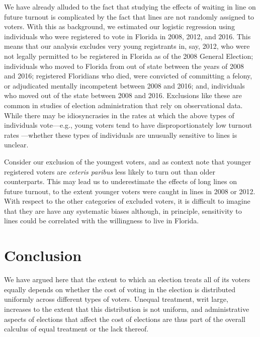 \documentclass[12pt,titlepage]{article}
\begin{document}
We have already alluded to the fact that studying the effects of
waiting in line on future turnout is complicated by the fact that
lines are not randomly assigned to voters.  With this as background,
we estimated our logistic regression using individuals who were
registered to vote in Florida in 2008, 2012, and 2016.  This means
that our analysis excludes very young registrants in, say, 2012, who
were not legally permitted to be registered in Florida as of the 2008
General Election; individuals who moved to Florida from out of state
between the years of 2008 and 2016; registered Floridians who died,
were convicted of committing a felony, or adjudicated mentally
incompetent between 2008 and 2016; and, individuals who moved out of
the state between 2008 and 2016.  Exclusions like these are common in
studies of election administration that rely on observational data.
While there may be idiosyncrasies in the rates at which the above
types of individuals vote---e.g., young voters tend to have
disproportionately low turnout rates
\citep{shinosmith:registrationtiming}---whether these types of
individuals are unusually sensitive to lines is unclear.

Consider our exclusion of the youngest voters, and as context note
that younger registered voters are \emph{ceteris paribus} less likely
to turn out \cite{shinosmith:registrationtiming} than older
counterparts.  This may lead us to underestimate the effects of long
lines on future turnout, to the extent younger voters were caught in
lines in 2008 or 2012.  With respect to the other categories of
excluded voters, it is difficult to imagine that they are have any
systematic biases although, in principle, sensitivity to lines could
be correlated with the willingness to live in Florida.




\section*{Conclusion}

We have argued here that the extent to which an election treats all of
its voters equally depends on whether the cost of voting in the
election is distributed uniformly across different types of voters.
Unequal treatment, writ large, increases to the extent that this
distribution is not uniform, and administrative aspects of elections
that affect the cost of elections are thus part of the overall
calculus of equal treatment or the lack thereof.
\end{document}
